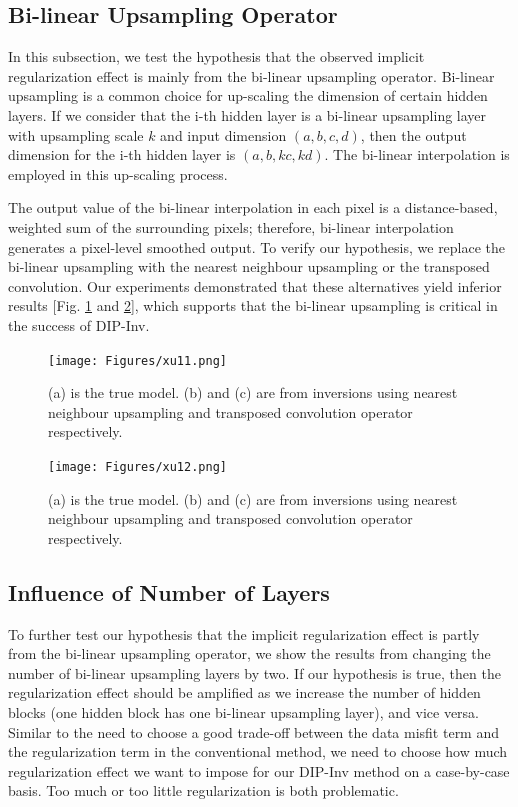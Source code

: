 \documentclass[lettersize,journal]{IEEEtran}
\begin{document}
\subsection{Bi-linear Upsampling Operator}
\label{sec:4.2}
In this subsection, we test the hypothesis that the observed implicit regularization effect is mainly from the bi-linear upsampling operator. Bi-linear upsampling is a common choice for up-scaling the dimension of certain hidden layers. If we consider that the i-th hidden layer is a bi-linear upsampling layer with upsampling scale $k$ and input dimension $(a, b, c, d)$, then the output dimension for the i-th hidden layer is $(a, b, kc, kd)$. The bi-linear interpolation is employed in this up-scaling process. 

The output value of the bi-linear interpolation in each pixel is a distance-based, weighted sum of the surrounding pixels; therefore, bi-linear interpolation generates a pixel-level smoothed output. To verify our hypothesis, we replace the bi-linear upsampling with the nearest neighbour upsampling or the transposed convolution. Our experiments demonstrated that these alternatives yield inferior results [Fig. \ref{fig3_9} and \ref{fig3_10}], which supports that the bi-linear upsampling is critical in the success of DIP-Inv.

\begin{figure}[!t]
\centering
\texttt{[image: Figures/xu11.png]}
\caption{(a) is the true model. (b) and (c) are from inversions using nearest neighbour upsampling and transposed convolution operator respectively.}
\label{fig3_9}
\end{figure}

\begin{figure}[!t]
\centering
\texttt{[image: Figures/xu12.png]}
\caption{(a) is the true model. (b) and (c) are from inversions using nearest neighbour upsampling and transposed convolution operator respectively.}
\label{fig3_10}
\end{figure}


\subsection{Influence of Number of Layers}
\label{sec:4.3}
To further test our hypothesis that the implicit regularization effect is partly from the bi-linear upsampling operator, we show the results from changing the number of bi-linear upsampling layers by two. If our hypothesis is true, then the regularization effect should be amplified as we increase the number of hidden blocks (one hidden block has one bi-linear upsampling layer), and vice versa. Similar to the need to choose a good trade-off between the data misfit term and the regularization term in the conventional method, we need to choose how much regularization effect we want to impose for our DIP-Inv method on a case-by-case basis. Too much or too little regularization is both problematic. 
\end{document}
